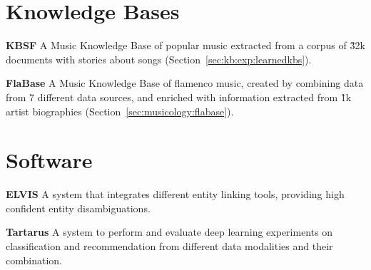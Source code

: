 \section{Knowledge Bases}

\noindent \textbf{KBSF} A Music Knowledge Base of popular music extracted from a corpus of \~32k documents with stories about songs (Section~\ref{sec:kb:exp:learnedkbs}).

\vspace{0.2cm}

\noindent \textbf{FlaBase} A Music Knowledge Base of flamenco music, created by combining data from 7 different data sources, and enriched with information extracted from \~1k artist biographies (Section~\ref{sec:musicology:flabase}).


\section{Software}

\noindent \textbf{ELVIS} A system that integrates different entity linking tools, providing high confident entity disambiguations.

\vspace{0.2cm}

\noindent \textbf{Tartarus} A system to perform and evaluate deep learning experiments on classification and recommendation from different data modalities and their combination.
 